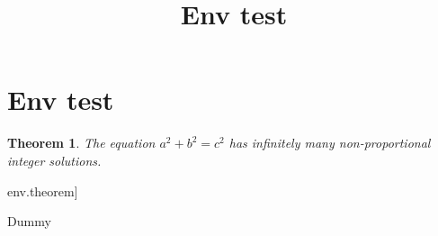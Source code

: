 \documentclass[11pt]{amsart}
\title{Env test}
\author{}
\date{}
\newtheorem{theorem}{Theorem}
\begin{document}
\maketitle
\section{Env test}

\begin{theorem}
The equation \(a^2 + b^2  = c^2\)
has infinitely many non-proportional
integer solutions.
\end{theorem}

env.theorem]


Dummy
\end{document}
